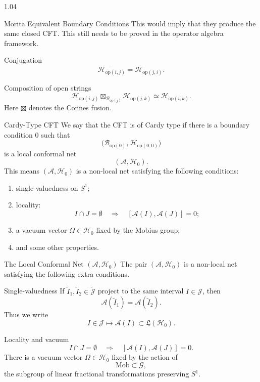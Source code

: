 \documentclass[xcolor={dvipsnames}]{beamer}
\theoremstyle{definition}
\theoremstyle{plain}
\newcommand{\MA}{\mathcal{A}}
\newcommand{\MB}{\mathcal{B}}
\newcommand{\MH}{\mathcal{H}}
\newcommand{\MJ}{\mathcal{J}}
\newcommand{\MG}{\mathscr{G}}
\newcommand{\op}{\mathrm{op}}
\newcommand{\Mob}{\mathrm{Mob}}
\newcommand{\Hopij}[2]{\MH_{\op(#1,#2)}}
\newcommand{\Bopi}[1]{\MB_{\op(#1)}}
\newcommand{\Jt}{\widetilde{\MJ}}
\begin{document}
\begin{spacing}{1.04}
\begin{frame}[t]{Morita Equivalent Boundary Conditions}
This would imply that they produce the same closed CFT. This still needs to be proved in the operator algebra framework.

\begin{block}{Conjugation}
\[
  \overline{\Hopij{i}{j}}=\Hopij{j}{i}.
\]
\end{block}

\begin{block}{Composition of open strings}
\[
  \Hopij{i}{j}\boxtimes_{\Bopi{j}}\Hopij{j}{k}
  \simeq
  \Hopij{i}{k}.
\]
Here $\boxtimes$ denotes the Connes fusion.
\end{block}
\end{frame}

\begin{frame}[t]{Cardy-Type CFT}
\small
We say that the CFT is of Cardy type if there is a boundary condition $0$ such that
\[
  \bigl(\Bopi{0},\Hopij{0}{0}\bigr)
\]
is a local conformal net
\[
  (\MA,\MH_0).
\]
This means $(\MA,\MH_0)$ is a non-local net satisfying the following conditions:

\begin{enumerate}
  \item single-valuedness on $S^1$;
  \item locality:
  \[
    I\cap J=\emptyset\quad\Rightarrow\quad
    [\MA(I),\MA(J)]=0;
  \]
  \item a vacuum vector $\Omega\in\MH_0$ fixed by the Mobius group;
  \item and some other properties.
\end{enumerate}
\end{frame}

\begin{frame}[t]{The Local Conformal Net $(\MA,\MH_0)$}
\scriptsize
\vspace{-.15cm}
The pair $(\MA,\MH_0)$ is a non-local net satisfying the following extra conditions.

\begin{block}{Single-valuedness}
If $\widetilde I_1,\widetilde I_2\in\Jt$ project to the same interval $I\in\MJ$, then
\[
  \MA(\widetilde I_1)=\MA(\widetilde I_2).
\]
Thus we write
\[
  I\in\MJ\longmapsto \MA(I)\subset\mathfrak L(\MH_0).
\]
\end{block}

\begin{block}{Locality and vacuum}
\[
  I\cap J=\emptyset \quad\Rightarrow\quad [\MA(I),\MA(J)]=0.
\]
There is a vacuum vector $\Omega\in\MH_0$ fixed by the action of
\[
  \Mob\subset \MG,
\]
the subgroup of linear fractional transformations preserving $S^1$.
\end{block}
\end{frame}


\end{spacing}
\end{document}
